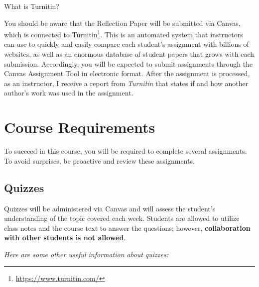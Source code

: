 \documentclass[
  letterpaper,
  DIV=11,
  numbers=noendperiod,
  oneside]{scrartcl}
\DeclareRobustCommand{\href}[2]{#2\footnote{\url{#1}}}
\begin{document}
What is Turnitin?

You should be aware that the Reflection Paper will be submitted via
Canvas, which is connected to
\href{https://www.turnitin.com/}{Turnitin}. This is an automated system
that instructors can use to quickly and easily compare each student's
assignment with billions of websites, as well as an enormous database of
student papers that grows with each submission. Accordingly, you will be
expected to submit assignments through the Canvas Assignment Tool in
electronic format. After the assignment is processed, as an instructor,
I receive a report from \emph{Turnitin} that states if and how another
author's work was used in the assignment.

\hypertarget{course-requirements}{%
\section{Course Requirements}\label{course-requirements}}

To succeed in this course, you will be required to complete several
assignments. To avoid surprises, be proactive and review these
assignments.

\hypertarget{quizzes}{%
\subsection{Quizzes}\label{quizzes}}

Quizzes will be administered via Canvas and will assess the student's
understanding of the topic covered each week. Students are allowed to
utilize class notes and the course text to answer the questions;
however, \textbf{collaboration with other students is not allowed}.

\emph{Here are some other useful information about quizzes:}
\end{document}
